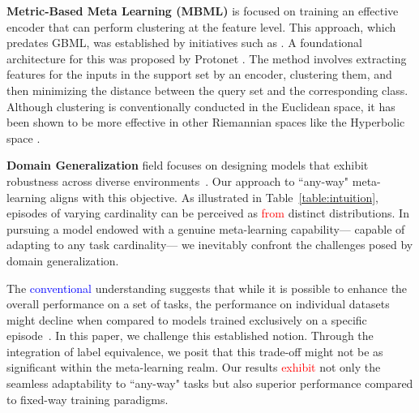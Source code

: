 \documentclass[letterpaper]{article} %
\newcommand{\nj}[1]{\textcolor{red}{#1}}
\newcommand{\jh}[1]{\textcolor{blue}{#1}}
\begin{document}
\textbf{Metric-Based Meta Learning (MBML)} is focused on training an effective encoder that can perform clustering at the feature level. This approach, which predates GBML, was established by initiatives such as \cite{label_equiv:matchingnetwork}. 
A foundational architecture for this was proposed by Protonet \cite{episodic:MBML:Protonet}. The method involves extracting features for the inputs in the support set by an encoder, clustering them, and then minimizing the distance between the query set and the corresponding class. Although clustering is conventionally conducted in the Euclidean space, it has been shown to be more effective in other Riemannian spaces like the Hyperbolic space \cite{episodic:MBML:Hyperbolic}.

\textbf{Domain Generalization} field focuses on designing
models that exhibit robustness across diverse environments~\cite{DG:Gunbon0,DG:Gunbon1}. Our approach to ``any-way" meta-learning aligns with this objective. As illustrated in Table~\ref{table:intuition}, episodes of varying cardinality can be perceived as \nj{from} distinct distributions. In pursuing a model endowed with a genuine meta-learning capability— capable of adapting to any task cardinality— we inevitably confront the challenges posed by domain generalization.

The \jh{conventional} understanding suggests that while it is possible to enhance the overall performance on a set of tasks, the performance on individual datasets might decline %
when compared to models trained exclusively %
on a specific episode~\cite{DG:wisdom0,DG:wisdom1,DG:wisdom2}. In this paper, we challenge this established notion. %
Through the integration of label equivalence, we posit that this trade-off might not be as significant %
within the meta-learning realm. Our results \nj{exhibit} not only the seamless adaptability to ``any-way" tasks but also superior performance compared to fixed-way training paradigms.
\end{document}
